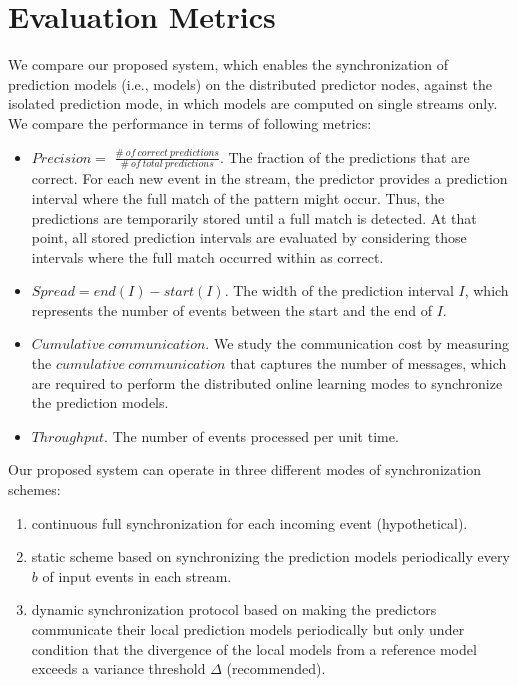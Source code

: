 \section{Evaluation Metrics} 
\label{sec:metrics}
\par We compare our proposed system, which enables the synchronization of prediction models (i.e., \pmcmr models) on the distributed predictor nodes,  against the isolated prediction mode, in which models are computed on single streams only. We compare the performance in terms of following metrics:
\begin{itemize}
	
	\item  $\mathit{Precision} =$ $ \mathit{\frac{\#\ of\ correct\ predictions}{\#\ of\ total\ predictions}}$. The fraction of the predictions that are correct. For each new event in the stream, the predictor provides a prediction interval where the full match of the pattern might occur. Thus, the predictions are temporarily stored until a full match is detected. At that point, all stored prediction intervals are evaluated by considering those intervals where the full match occurred within as correct.     
	
	\item $\mathit{Spread}$$ =end(I) -start(I)$. The width of the prediction interval $I$, which represents the number of events between the start and the end of $I$. 
	
	\item  $\mathit{Cumulative\ communication}$. We study the communication cost by measuring the $\mathit{cumulative\ communication}$ that captures the number of messages, which are required to perform the distributed online learning modes to synchronize the prediction models.
	
\item $Throughput$. The number of events processed per unit time.
\end{itemize} 

Our proposed system can operate in three different modes of synchronization schemes: \begin{enumerate}[label=(\roman*)] 
	\item continuous full synchronization for each incoming event (hypothetical).
	\item static scheme based on synchronizing the prediction models periodically every $b$ of input events in each stream.
	\item dynamic synchronization protocol based on making the predictors communicate their local prediction models periodically but only under condition that the divergence of the local models from a reference model exceeds a variance threshold $\Delta$ (recommended).  	   
	
\end{enumerate}



